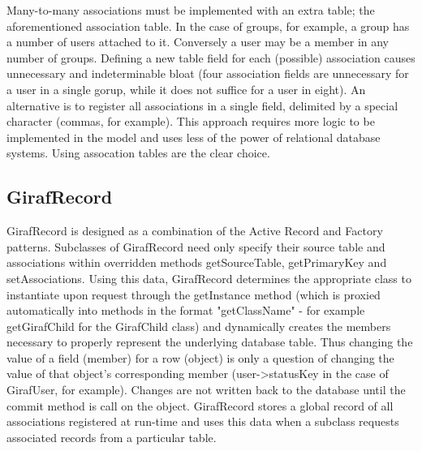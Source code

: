 Many-to-many associations must be implemented with an extra table; the aforementioned association table. In the case of groups, for example, a group has a number of users attached to it. Conversely a user may be a member in any number of groups. Defining a new table field for each (possible) association causes unnecessary and indeterminable bloat (four association fields are unnecessary for a user in a single gorup, while it does not suffice for a user in eight). An alternative is to register all associations in a single field, delimited by a special character (commas, for example). This approach requires more logic to be implemented in the model and uses less of the power of relational database systems. Using assocation tables are the clear choice.

\subsection{GirafRecord}
GirafRecord is designed as a combination of the Active Record and Factory patterns. Subclasses of GirafRecord need only specify their source table and associations within overridden methods getSourceTable, getPrimaryKey and setAssociations. Using this data, GirafRecord determines the appropriate class to instantiate upon request through the getInstance method (which is proxied automatically into methods in the format "getClassName" - for example getGirafChild for the GirafChild class) and dynamically creates the members necessary to properly represent the underlying database table. Thus changing the value of a field (member) for a row (object) is only a question of changing the value of that object's corresponding member (user->statusKey in the case of GirafUser, for example). Changes are not written back to the database until the commit method is call on the object.
GirafRecord stores a global record of all associations registered at run-time and uses this data when a subclass requests associated records from a particular table.